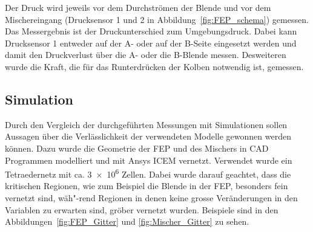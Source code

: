 Der Druck wird jeweils vor dem Durchströmen der Blende und vor dem Mischereingang (Drucksensor 1 und 2 in Abbildung~\ref{fig:FEP_schema}) gemessen. Das Messergebnis ist der Druckunterschied zum Umgebungsdruck.
Dabei kann Drucksensor 1 entweder auf der A- oder auf der B-Seite eingesetzt werden und damit den Druckverlust über die A- oder die B-Blende messen.
Desweiteren wurde die Kraft, die für das Runterdrücken der Kolben notwendig ist, gemessen.
%
\subsection{Simulation}
Durch den Vergleich der durchgeführten Messungen mit Simulationen sollen Aussagen über die Verlässlichkeit der verwendeten Modelle gewonnen werden können.
Dazu wurde die Geometrie der FEP und des Mischers in CAD Programmen modelliert und mit Ansys ICEM vernetzt. Verwendet wurde ein Tetraedernetz mit ca. \num{3e6} Zellen. Dabei wurde darauf geachtet, dass die kritischen Regionen, wie zum Beispiel die Blende in der FEP, besonders fein vernetzt sind, wäh"-rend Regionen in denen keine grosse Veränderungen in den Variablen zu erwarten sind, gröber vernetzt wurden. Beispiele sind in den Abbildungen~\ref{fig:FEP_Gitter} und \ref{fig:Mischer_Gitter} zu sehen.

